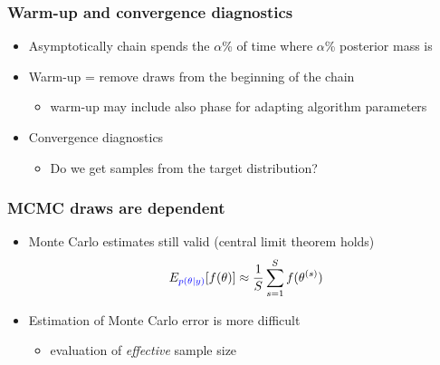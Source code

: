 \documentclass[10pt,handout]{beamer}
\begin{document}
\begin{frame}

\frametitle{ Warm-up and convergence diagnostics}

  \begin{itemize}
  \item Asymptotically chain spends the $\alpha$\% of time where
    $\alpha$\% posterior mass is
      \vspace{-.5\baselineskip}
    \item<3-> Warm-up = remove draws from the beginning of the chain
      \begin{itemize}
      \item warm-up may include also phase for adapting algorithm parameters
      \end{itemize}
    \item<4-> Convergence diagnostics
      \begin{itemize}
      \item Do we get samples from the target distribution?
      \end{itemize}
  \end{itemize}

\end{frame}

\begin{frame}

\frametitle{ MCMC draws are dependent}

  \begin{itemize}
    \item Monte Carlo estimates still valid (central limit theorem holds)
      \begin{align*}
        E_{\color{blue} p(\theta|y)}[f(\theta)] \approx \frac{1}{S} \sum_{s=1}^S f(\theta^{(s)})
      \end{align*}
    \item Estimation of Monte Carlo error is more difficult
      \begin{itemize}
      \item evaluation of {\it effective} sample size
      \end{itemize}
    \end{itemize}

\end{frame}
\end{document}
